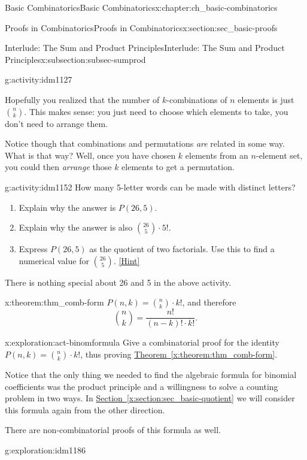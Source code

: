 \documentclass[oneside,10pt,]{book}
\numberwithin{equation}{chapter}
\begin{document}
\begin{chapterptx}{Basic Combinatorics}{}{Basic Combinatorics}{}{}{x:chapter:ch_basic-combinatorics}
\begin{sectionptx}{Proofs in Combinatorics}{}{Proofs in Combinatorics}{}{}{x:section:sec_basic-proofs}
\begin{subsectionptx}{Interlude: The Sum and Product Principles}{}{Interlude: The Sum and Product Principles}{}{}{x:subsection:subsec-sumprod}
\begin{activity}{}{g:activity:idm1127}
\end{activity}
Hopefully you realized that the number of \(k\)-combinations of \(n\) elements is just \(\binom{n}{k}\).  This makes sense: you just need to choose which elements to take, you don't need to arrange them.%
\par
Notice though that combinations and permutations \emph{are} related in some way.  What is that way?  Well, once you have chosen \(k\) elements from an \(n\)-element set, you could then \emph{arrange} those \(k\) elements to get a permutation.%
\begin{activity}{}{g:activity:idm1152}%
How many 5-letter words can be made with distinct letters?%
\begin{enumerate}[font=\bfseries,label=(\alph*),ref=\alph*]
\item{}Explain why the answer is \(P(26,5)\).%
\item{}Explain why the answer is also \(\binom{26}{5}\cdot 5!\).%
\item{}Express \(P(26,5)\) as the quotient of two factorials.  Use this to find a numerical value for \(\binom{26}{5}\).%
\space\hspace*{0pt}\hfill{\tiny\hyperlink{g:hint:idm1166-back}{[Hint]}}\end{enumerate}
\end{activity}
There is nothing special about 26 and 5 in the above activity.%
\begin{theorem}{}{}{x:theorem:thm_comb-form}%
\(P(n,k) = \binom{n}{k}\cdot k!\), and therefore%
\begin{equation*}
\binom{n}{k} = \frac{n!}{(n-k)!\cdot k!}\text{.}
\end{equation*}
%
\end{theorem}
\begin{exploration}{}{x:exploration:act-binomformula}%
Give a combinatorial proof for the identity \(P(n,k) = \binom{n}{k}\cdot k!\), thus proving \hyperref[x:theorem:thm_comb-form]{Theorem~\ref{x:theorem:thm_comb-form}}.%
\end{exploration}
Notice that the only thing we needed to find the algebraic formula for binomial coefficients was the product principle and a willingness to solve a counting problem in two ways.  In \hyperref[x:section:sec_basic-quotient]{Section~\ref{x:section:sec_basic-quotient}} we will consider this formula again from the other direction.%
\par
There are non-combinatorial proofs of this formula as well.%
\begin{exploration}{}{g:exploration:idm1186}%

\end{exploration}
\end{subsectionptx}
\end{sectionptx}
\end{chapterptx}
\end{document}
